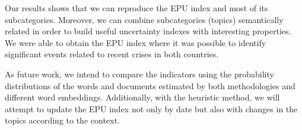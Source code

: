 \documentclass{article}
\begin{document}
Our results shows that we can reproduce the EPU index and most of its subcategories. Moreover, we can combine subcategories (topics) semantically related in order to build useful uncertainty indexes with interesting properties. We were able to obtain the EPU index where it was possible to identify significant events related to recent crises in both countries. 

As future work, we intend to compare the indicators using the probability distributions of the words and documents estimated by both methodologies and different word embeddings. Additionally, with the heuristic method, we will attempt to update the EPU index not only by date but also with changes in the topics according to the context. 



\end{document}
